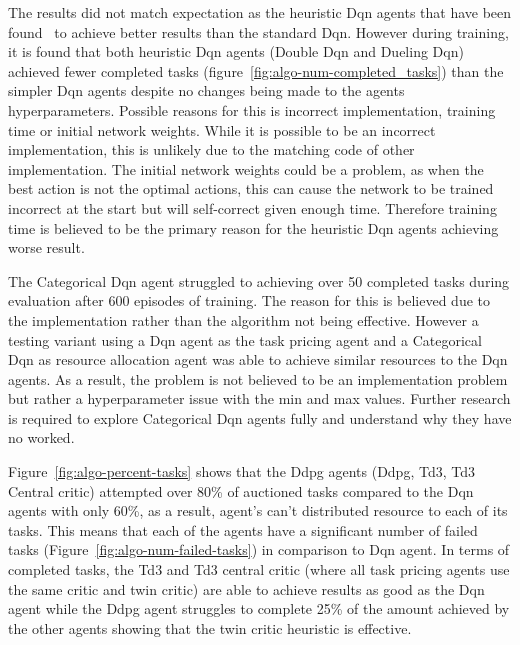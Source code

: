 The results did not match expectation as the heuristic Dqn agents that have been
found~\citep{doubledqn, duelingdqn, rainbow} to achieve better results than the standard Dqn. However during training,
it is found that both heuristic Dqn agents (Double Dqn and Dueling Dqn) achieved fewer completed tasks
(figure~\ref{fig:algo-num-completed_tasks}) than the simpler Dqn agents despite no changes
being made to the agents hyperparameters. Possible reasons for this is incorrect implementation,
training time or initial network weights. While it is possible to be an incorrect implementation, this is unlikely
due to the matching code of other implementation. The initial network weights could be a problem,
as when the best action is not the optimal actions, this can cause the network to be trained incorrect at the start but
will self-correct given enough time. Therefore training time is believed to be the primary reason for the heuristic Dqn
agents achieving worse result.

The Categorical Dqn agent struggled to achieving over 50 completed tasks during evaluation after 600 episodes of
training. The reason for this is believed due to the implementation rather than the algorithm not being effective.
However a testing variant using a Dqn agent as the task pricing agent and a Categorical Dqn as resource allocation
agent was able to achieve similar resources to the Dqn agents. As a result, the problem is not believed to be an
implementation problem but rather a hyperparameter issue with the min and max values. Further research is required to
explore Categorical Dqn agents fully and understand why they have no worked.

Figure~\ref{fig:algo-percent-tasks} shows that the Ddpg agents (Ddpg, Td3, Td3 Central critic) attempted over 80\% of
auctioned tasks compared to the Dqn agents with only 60\%, as a result, agent's can't distributed resource to
each of its tasks. This means that each of the agents have a significant number of failed tasks
(Figure~\ref{fig:algo-num-failed-tasks}) in comparison to Dqn agent. In terms of completed tasks, the Td3 and Td3
central critic (where all task pricing agents use the same critic and twin critic) are able to achieve results as good
as the Dqn agent while the Ddpg agent struggles to complete 25\% of the amount achieved by the other agents showing
that the twin critic heuristic is effective.


